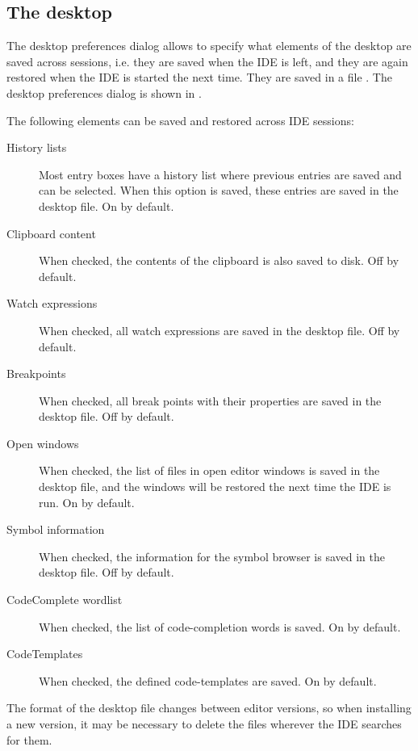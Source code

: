\subsection{The desktop}
\label{se:prefdesktop}
The desktop preferences dialog allows to specify what elements of the
desktop are saved across sessions, i.e. they are saved when the IDE is left,
and they are again restored when the IDE is started the next time.
They are saved in a file .
The desktop preferences dialog is shown in .


The following elements can be saved and restored across IDE sessions:
\begin{description}
\item[History lists] Most entry boxes have a history list where previous
entries are saved and can be selected. When this option is saved, these
entries are saved in the desktop file. On by default.
\item[Clipboard content]
When checked, the contents of the clipboard is also saved to disk. Off by
default.
\item[Watch expressions]
When checked, all watch expressions are saved in the desktop file. Off by
default.
\item[Breakpoints]
When checked, all break points with their properties are saved in the
desktop file. Off by default.
\item[Open windows]
When checked, the list of files in open editor windows is saved in the
desktop file, and the windows will be restored the next time the IDE
is run. On by default.
\item[Symbol information]
When checked, the information for the symbol browser is saved in the desktop
file. Off by default.
\item[CodeComplete wordlist]
When checked, the list of code-completion words is saved. On by default.
\item[CodeTemplates]
When checked, the defined code-templates are saved. On by default.
\end{description}

\begin{remark}
The format of the desktop file changes between editor versions, so
when installing a new version, it may be necessary to delete the
 files wherever the IDE searches for them.
\end{remark}

%
%
